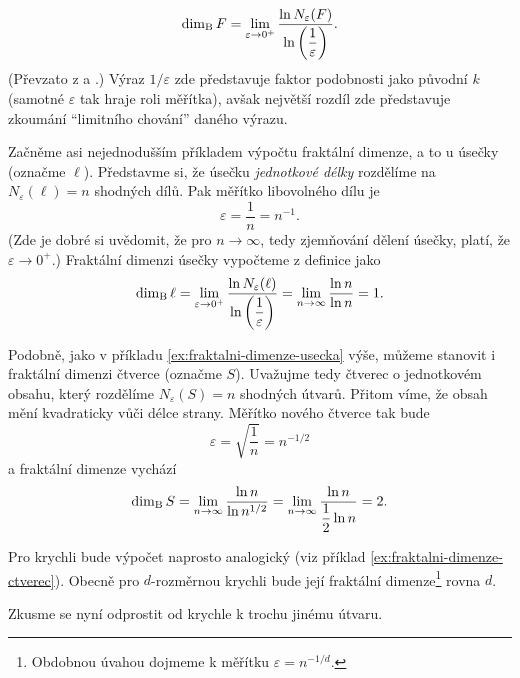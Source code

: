 \begin{equation}\label{eq:fraktalni-dimenze}
    \operatorname{dim_B}{F}=\lim_{\varepsilon\to 0^+}{\dfrac{\ln{N_\varepsilon(F)}}{\ln{\left(\dfrac{1}{\varepsilon}\right)}}}.
\end{equation}
(Převzato z \cite[str. 93]{Zelinka2006} a \cite[str. 28]{Falconer2014}.) Výraz $1/\varepsilon$ zde představuje faktor podobnosti jako původní $k$ (samotné $\varepsilon$ tak hraje roli měřítka), avšak největší rozdíl zde představuje zkoumání ``limitního chování'' daného výrazu.
\begin{example}\label{ex:fraktalni-dimenze-usecka}
    Začněme asi nejednodušším příkladem výpočtu fraktální dimenze, a to u úsečky (označme $\ell$). Představme si, že úsečku \emph{jednotkové délky} rozdělíme na $N_\varepsilon(\ell)=n$ shodných dílů. Pak měřítko libovolného dílu je
    \[\varepsilon=\dfrac{1}{n}=n^{-1}.\]
    (Zde je dobré si uvědomit, že pro $n\to\infty$, tedy zjemňování dělení úsečky, platí, že $\varepsilon\to 0^+$.) Fraktální dimenzi úsečky vypočteme z definice jako
    \[\operatorname{dim_B}{\ell}=\lim_{\varepsilon\to 0^+}{\dfrac{\ln{N_\varepsilon(\ell)}}{\ln{\left(\dfrac{1}{\varepsilon}\right)}}}=\lim_{n\to\infty}{\dfrac{\ln{n}}{\ln{n}}}=1.\]
\end{example}
\begin{example}\label{ex:fraktalni-dimenze-ctverec}
    Podobně, jako v příkladu \ref{ex:fraktalni-dimenze-usecka} výše, můžeme stanovit i fraktální dimenzi čtverce (označme $S$). Uvažujme tedy čtverec o jednotkovém obsahu, který rozdělíme $N_\varepsilon(S)=n$ shodných útvarů. Přitom víme, že obsah mění kvadraticky vůči délce strany. Měřítko nového čtverce tak bude
    \[\varepsilon=\sqrt{\dfrac{1}{n}}=n^{-1/2}\]
    a fraktální dimenze vychází
    \[\operatorname{dim_B}{S}=\lim_{n\to\infty}{\dfrac{\ln{n}}{\ln{n^{1/2}}}}=\lim_{n\to\infty}{\dfrac{\ln{n}}{\dfrac{1}{2}\ln{n}}}=2.\]
\end{example}
Pro krychli bude výpočet naprosto analogický (viz příklad \ref{ex:fraktalni-dimenze-ctverec}). Obecně pro $d$-rozměrnou krychli bude její fraktální dimenze\footnote{Obdobnou úvahou dojmeme k měřítku $\varepsilon=n^{-1/d}$.} rovna $d$.\par
Zkusme se nyní odprostit od krychle k trochu jinému útvaru.
